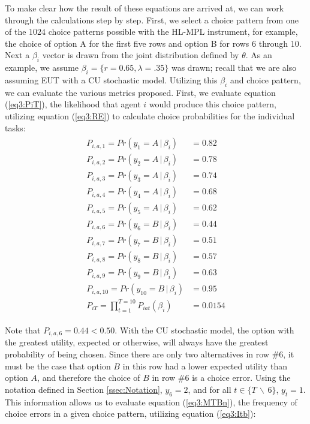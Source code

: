 \documentclass[../main.tex]{subfiles}
\begin{document}
To make clear how the result of these equations are arrived at, we can work through the calculations step by step.
First, we select a choice pattern from one of the $1024$ choice patterns possible with the HL-MPL instrument, for example, the choice of option A for the first five rows and option B for rows $6$ through $10$.
Next a $\beta_i$ vector is drawn from the joint distribution defined by $\theta$.
As an example, we assume $\beta_i = \lbrace r = 0.65, \lambda = .35\rbrace$ was drawn; recall that we are also assuming EUT with a CU stochastic model.
Utilizing this $\beta_i$ and choice pattern, we can evaluate the various metrics proposed.
First, we evaluate equation (\ref{eq3:PiT}), the likelihood that agent $i$ would produce this choice pattern, utilizing equation (\ref{eq3:RE}) to calculate choice probabilities for the individual tasks:
\begin{align}
	\label{eq3:example_PiT}
	\begin{split}
		P_{i,a,1}  = Pr(y_1 = A    \,|\, \beta_i)    &= 0.82 \\
		P_{i,a,2}  = Pr(y_2 = A    \,|\, \beta_i)    &= 0.78 \\
		P_{i,a,3}  = Pr(y_3 = A    \,|\, \beta_i)    &= 0.74 \\
		P_{i,a,4}  = Pr(y_4 = A    \,|\, \beta_i)    &= 0.68 \\
		P_{i,a,5}  = Pr(y_5 = A    \,|\, \beta_i)    &= 0.62 \\
		P_{i,a,6}  = Pr(y_6 = B    \,|\, \beta_i)    &= 0.44 \\
		P_{i,a,7}  = Pr(y_7 = B    \,|\, \beta_i)    &= 0.51 \\
		P_{i,a,8}  = Pr(y_8 = B    \,|\, \beta_i)    &= 0.57 \\
		P_{i,a,9}  = Pr(y_9 = B    \,|\, \beta_i)    &= 0.63 \\
		P_{i,a,10} = Pr(y_{10} = B \,|\, \beta_i)    &= 0.95 \\
		P_{iT}     = \prod_{t = 1}^{T = 10} P_{iat}(\beta_i)  &= 0.0154
	\end{split}
\end{align}

\noindent Note that $P_{i,a,6} = 0.44 < 0.50$.
With the CU stochastic model, the option with the greatest utility, expected or otherwise, will always have the greatest probability of being chosen.
Since there are only two alternatives in row \#6, it must be the case that option $B$ in this row had a lower expected utility than option $A$, and therefore the choice of $B$ in row \#6 is a choice error.
Using the notation defined in Section \ref{ssec:Notation}, $y_6 = 2$, and for all $t \in \lbrace T \,\backslash\, 6 \rbrace$, $y_t = 1$.
This information allows us to evaluate equation (\ref{eq3:MTBn}), the frequency of choice errors in a given choice pattern, utilizing equation (\ref{eq3:Itb}):
\end{document}
